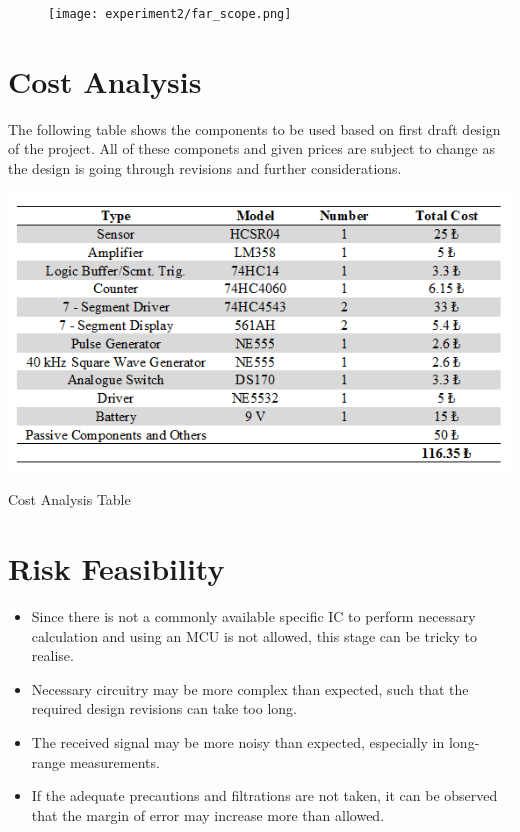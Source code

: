 \documentclass[12pt, a4paper]{article}
\begin{document}
        \begin{figure}[H]\centering
            \texttt{[image: experiment2/far\_scope.png]}
            \caption[]{}\label{fig:far_scope}
        \end{figure}


        





    
    \section{Cost Analysis}

        The following table shows the components to be used based on first draft design of the project. All of these componets and given prices are subject to change as the design is going through revisions and further considerations.
        
        \begin{table}[H]\centering
            \includegraphics[width=\textwidth]{cost.png}
            \caption[]{Cost Analysis Table}\label{tab:cost}
        \end{table}

    \section{Risk Feasibility}

        \begin{itemize}
            \item Since there is not a commonly available specific IC to perform necessary calculation and using an MCU is not allowed, this stage can be tricky to realise.
            \item Necessary circuitry may be more complex than expected, such that the required design revisions can take too long.
            \item The received signal may be more noisy than expected, especially in long-range measurements. 
            \item If the adequate precautions and filtrations are not taken, it can be observed that the margin of error may increase more than allowed.
        \end{itemize}   
\end{document}
